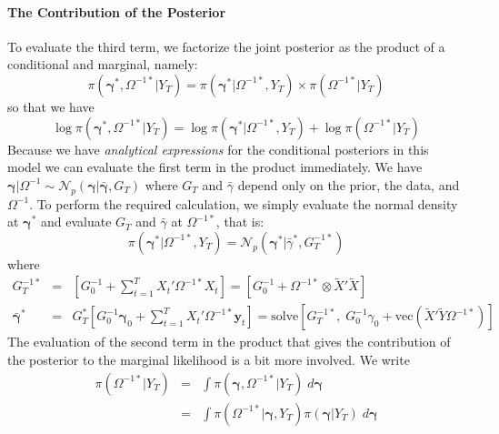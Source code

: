 \documentclass[12pt]{article}
\begin{document}
\paragraph{The Contribution of the Posterior}
To evaluate the third term, we factorize the joint posterior as the product of a conditional and marginal, namely:
\begin{equation*}
  \pi\left( \boldsymbol{\gamma}^*, \Omega^{-1*}|Y_T \right) = \pi\left( \boldsymbol{\gamma}^*|\Omega^{-1*},Y_T \right) \times \pi\left( \Omega^{-1*}|Y_T \right)
\end{equation*}
so that we have
\begin{equation*}
  \log \pi\left( \boldsymbol{\gamma}^*, \Omega^{-1*}|Y_T \right) = \log \pi\left( \boldsymbol{\gamma}^*|\Omega^{-1*},Y_T \right) + \log \pi\left( \Omega^{-1*}|Y_T \right)
\end{equation*}
Because we have \emph{analytical expressions} for the conditional posteriors in this model we can evaluate the first term in the product immediately.
We have $\boldsymbol{\gamma}|\Omega^{-1} \sim \mathcal{N}_p\left( \boldsymbol{\gamma}|\bar{\boldsymbol{\gamma}}, G_T \right)$ where $G_T$ and $\bar{\gamma}$ depend only on the prior, the data, and $\Omega^{-1}$.
To perform the required calculation, we simply evaluate the normal density at $\boldsymbol{\gamma}^*$ and evaluate $G_T$ and $\bar{\gamma}$ at $\Omega^{-1*}$, that is:
\begin{equation*}
  \pi\left( \boldsymbol{\gamma}^*|\Omega^{-1*}, Y_T \right) = \mathcal{N}_p\left( \boldsymbol{\gamma}^*|\bar{\gamma}^*, G_T^{-1*}\right)
\end{equation*}
where
\begin{eqnarray*}
  G_T^{-1*} &=& \left[ G_0^{-1} + \sum_{t=1}^T X_t' \Omega^{-1*} X_t \right] = \left[ G_0^{-1} + \Omega^{-1*} \otimes \widetilde{X}'\widetilde{X} \right]\\
  \bar{\boldsymbol{\gamma}}^* &=& G_T^* \left[ G_0^{-1}\boldsymbol{\gamma}_0 + \sum_{t=1}^{T} X_t'\Omega^{-1*}\mathbf{y}_t \right] = \mbox{solve}\left[G_T^{-1*},\;  G_0^{-1}\gamma_0 + \mbox{vec}\left( \widetilde{X}'\widetilde{Y}\Omega^{-1*} \right) \right]
\end{eqnarray*}
The evaluation of the second term in the product that gives the contribution of the posterior to the marginal likelihood is a bit more involved.
We write
\begin{eqnarray*}
  \pi\left( \Omega^{-1*}|Y_T \right) &=&  \int \pi\left( \boldsymbol{\gamma},\Omega^{-1*}|Y_T \right) \; d\boldsymbol{\gamma}\\
  &=& \int \pi\left( \Omega^{-1*}|\boldsymbol{\gamma}, Y_T \right)\pi\left( \boldsymbol{\gamma}|Y_T \right)\; d\boldsymbol{\gamma}
\end{eqnarray*}
\end{document}
